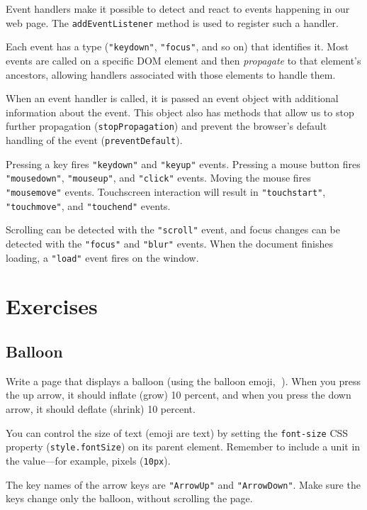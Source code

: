 Event handlers make it possible to detect and react to events happening in our web page. The \lstinline`addEventListener` method is used to register such a handler.

Each event has a type (\lstinline`"keydown"`, \lstinline`"focus"`, and so on) that identifies it. Most events are called on a specific DOM element and then \emph{propagate} to that element's ancestors, allowing handlers associated with those elements to handle them.

When an event handler is called, it is passed an event object with additional information about the event. This object also has methods that allow us to stop further propagation (\lstinline`stopPropagation`) and prevent the browser's default handling of the event (\lstinline`preventDefault`).

Pressing a key fires \lstinline`"keydown"` and \lstinline`"keyup"` events. Pressing a mouse button fires \lstinline`"mousedown"`, \lstinline`"mouseup"`, and \lstinline`"click"` events. Moving the mouse fires \lstinline`"mousemove"` events. Touchscreen interaction will result in \lstinline`"touchstart"`, \lstinline`"touchmove"`, and \lstinline`"touchend"` events.

Scrolling can be detected with the \lstinline`"scroll"` event, and focus changes can be detected with the \lstinline`"focus"` and \lstinline`"blur"` events. When the document finishes loading, a \lstinline`"load"` event fires on the window.

\section{Exercises}

\subsection{Balloon}

Write a page that displays a balloon (using the balloon emoji, 🎈). When you press the up arrow, it should inflate (grow) 10 percent, and when you press the down arrow, it should deflate (shrink) 10 percent.

You can control the size of text (emoji are text) by setting the \lstinline`font-size` CSS property (\lstinline`style.fontSize`) on its parent element. Remember to include a unit in the value—for example, pixels (\lstinline`10px`).

The key names of the arrow keys are \lstinline`"ArrowUp"` and \lstinline`"ArrowDown"`. Make sure the keys change only the balloon, without scrolling the page.

